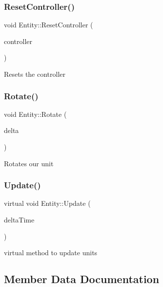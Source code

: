 \subsubsection{\texorpdfstring{ResetController()}{ResetController()}}
{\footnotesize\ttfamily void Entity\+::\+Reset\+Controller (\begin{DoxyParamCaption}\item[{\mbox{\hyperlink{class_entity_controller}{Entity\+Controller}} $\ast$}]{controller }\end{DoxyParamCaption})}

Resets the controller \mbox{\label{class_entity_a78a4083bdd81fc24365f7bb86e291425}} 
\subsubsection{\texorpdfstring{Rotate()}{Rotate()}}
{\footnotesize\ttfamily void Entity\+::\+Rotate (\begin{DoxyParamCaption}\item[{const float \&}]{delta }\end{DoxyParamCaption})\hspace{0.3cm}{\ttfamily [inline]}}

Rotates our unit \mbox{\label{class_entity_a87a4695d4f5ca340346e2e44b2fdb26a}} 
\subsubsection{\texorpdfstring{Update()}{Update()}}
{\footnotesize\ttfamily virtual void Entity\+::\+Update (\begin{DoxyParamCaption}\item[{const float \&}]{delta\+Time }\end{DoxyParamCaption})\hspace{0.3cm}{\ttfamily [virtual]}}

virtual method to update units 

\subsection{Member Data Documentation}
\mbox{\label{class_entity_aae95fabac07322ac31d03b582f74f393}} 
